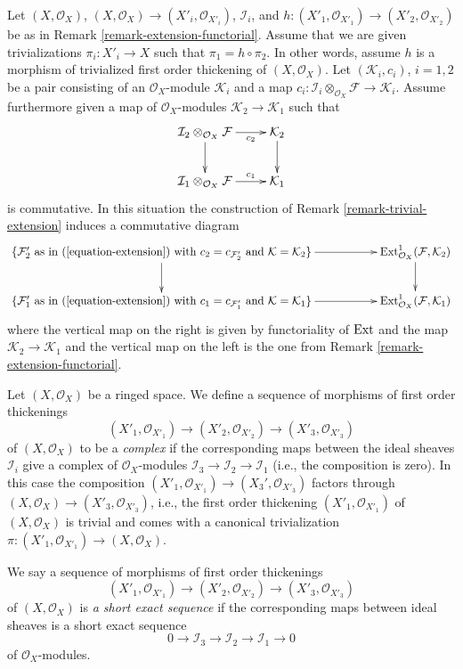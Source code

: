 \begin{remark}
\label{remark-trivial-extension-functorial}
Let $(X, \mathcal{O}_X)$, $(X, \mathcal{O}_X) \to (X'_i, \mathcal{O}_{X'_i})$,
$\mathcal{I}_i$, and
$h : (X'_1, \mathcal{O}_{X'_1}) \to (X'_2, \mathcal{O}_{X'_2})$
be as in Remark \ref{remark-extension-functorial}. Assume that we are
given trivializations $\pi_i : X'_i \to X$ such that
$\pi_1 = h \circ \pi_2$. In other words, assume $h$ is a morphism
of trivialized first order thickening of $(X, \mathcal{O}_X)$. Let
$(\mathcal{K}_i, c_i)$, $i = 1, 2$ be a pair consisting of an
$\mathcal{O}_X$-module $\mathcal{K}_i$ and a map
$c_i : \mathcal{I}_i \otimes_{\mathcal{O}_X} \mathcal{F} \to
\mathcal{K}_i$. Assume furthermore given a map
of $\mathcal{O}_X$-modules $\mathcal{K}_2 \to \mathcal{K}_1$
such that
$$
\xymatrix{
\mathcal{I}_2 \otimes_{\mathcal{O}_X} \mathcal{F}
\ar[r]_-{c_2} \ar[d] &
\mathcal{K}_2 \ar[d] \\
\mathcal{I}_1 \otimes_{\mathcal{O}_X} \mathcal{F}
\ar[r]^-{c_1} &
\mathcal{K}_1
}
$$
is commutative. In this situation the construction of
Remark \ref{remark-trivial-extension} induces
a commutative diagram
$$
\xymatrix{
\{\mathcal{F}'_2\text{ as in (\ref{equation-extension}) with }
c_2 = c_{\mathcal{F}'_2}\text{ and }\mathcal{K} = \mathcal{K}_2\}
\ar[d] \ar[rr] & &
\Ext^1_{\mathcal{O}_X}(\mathcal{F}, \mathcal{K}_2) \ar[d] \\
\{\mathcal{F}'_1\text{ as in (\ref{equation-extension}) with }
c_1 = c_{\mathcal{F}'_1}\text{ and }\mathcal{K} = \mathcal{K}_1\}
\ar[rr] & &
\Ext^1_{\mathcal{O}_X}(\mathcal{F}, \mathcal{K}_1)
}
$$
where the vertical map on the right is given by functoriality of $\mathop{\mathrm{Ext}}\nolimits$
and the map $\mathcal{K}_2 \to \mathcal{K}_1$ and the vertical map on the left
is the one from Remark \ref{remark-extension-functorial}.
\end{remark}

\begin{remark}
\label{remark-short-exact-sequence-thickenings}
Let $(X, \mathcal{O}_X)$ be a ringed space. We define a sequence of morphisms
of first order thickenings
$$
(X'_1, \mathcal{O}_{X'_1}) \to
(X'_2, \mathcal{O}_{X'_2}) \to
(X'_3, \mathcal{O}_{X'_3})
$$
of $(X, \mathcal{O}_X)$ to be a {\it complex}
if the corresponding maps between
the ideal sheaves $\mathcal{I}_i$
give a complex of $\mathcal{O}_X$-modules
$\mathcal{I}_3 \to \mathcal{I}_2 \to \mathcal{I}_1$
(i.e., the composition is zero). In this case the composition
$(X'_1, \mathcal{O}_{X'_1}) \to (X_3', \mathcal{O}_{X'_3})$ factors through
$(X, \mathcal{O}_X) \to (X'_3, \mathcal{O}_{X'_3})$, i.e.,
the first order thickening $(X'_1, \mathcal{O}_{X'_1})$ of
$(X, \mathcal{O}_X)$ is trivial and comes with
a canonical trivialization
$\pi : (X'_1, \mathcal{O}_{X'_1}) \to (X, \mathcal{O}_X)$.

\medskip\noindent
We say a sequence of morphisms of first order thickenings
$$
(X'_1, \mathcal{O}_{X'_1}) \to
(X'_2, \mathcal{O}_{X'_2}) \to
(X'_3, \mathcal{O}_{X'_3})
$$
of $(X, \mathcal{O}_X)$ is {\it a short exact sequence} if the
corresponding maps between ideal sheaves is a short exact sequence
$$
0 \to \mathcal{I}_3 \to \mathcal{I}_2 \to \mathcal{I}_1 \to 0
$$
of $\mathcal{O}_X$-modules.
\end{remark}

